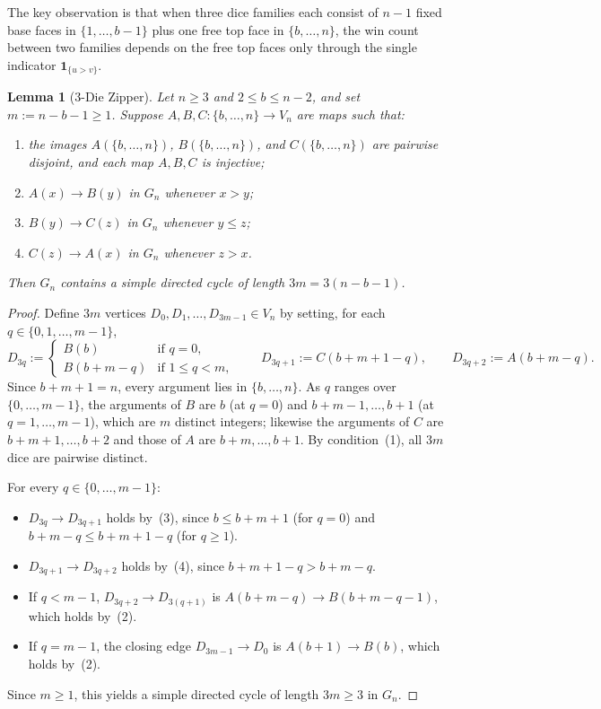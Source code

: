 \documentclass[11pt]{article}
\newtheorem{lemma}[theorem]{Lemma}
\begin{document}
The key observation is that when three dice families each consist of $n - 1$ fixed base faces in $\{1,\dots,b-1\}$ plus one free top face in $\{b,\dots,n\}$, the win count between two families depends on the free top faces only through the single indicator $\mathbf{1}_{\{u > v\}}$.

\begin{lemma}[3-Die Zipper]\label{lem:zipper}
Let $n \ge 3$ and $2 \le b \le n - 2$, and set $m := n - b - 1 \ge 1$. Suppose $A, B, C : \{b,\dots,n\} \to V_n$ are maps such that:
\begin{enumerate}
  \item the images $A(\{b,\dots,n\})$, $B(\{b,\dots,n\})$, and $C(\{b,\dots,n\})$ are pairwise disjoint, and each map $A, B, C$ is injective;
  \item $A(x) \to B(y)$ in $G_n$ whenever $x > y$;
  \item $B(y) \to C(z)$ in $G_n$ whenever $y \le z$;
  \item $C(z) \to A(x)$ in $G_n$ whenever $z > x$.
\end{enumerate}
Then $G_n$ contains a simple directed cycle of length $3m = 3(n - b - 1)$.
\end{lemma}

\begin{proof}
Define $3m$ vertices $D_0, D_1, \dots, D_{3m-1} \in V_n$ by setting, for each $q \in \{0, 1, \dots, m - 1\}$,
\[
  D_{3q} :=
  \begin{cases}
    B(b) & \text{if } q = 0, \\
    B(b + m - q) & \text{if } 1 \le q < m,
  \end{cases}
  \qquad
  D_{3q+1} := C(b + m + 1 - q),
  \qquad
  D_{3q+2} := A(b + m - q).
\]
Since $b + m + 1 = n$, every argument lies in $\{b,\dots,n\}$. As $q$ ranges over $\{0,\dots,m-1\}$, the arguments of $B$ are $b$ (at $q = 0$) and $b+m-1, \dots, b+1$ (at $q = 1,\dots,m-1$), which are $m$ distinct integers; likewise the arguments of $C$ are $b+m+1,\dots,b+2$ and those of $A$ are $b+m,\dots,b+1$. By condition~(1), all $3m$ dice are pairwise distinct.

For every $q \in \{0,\dots,m-1\}$:
\begin{itemize}
  \item $D_{3q} \to D_{3q+1}$ holds by~(3), since $b \le b+m+1$ (for $q = 0$) and $b+m-q \le b+m+1-q$ (for $q \ge 1$).
  \item $D_{3q+1} \to D_{3q+2}$ holds by~(4), since $b+m+1-q > b+m-q$.
  \item If $q < m - 1$, $D_{3q+2} \to D_{3(q+1)}$ is $A(b+m-q) \to B(b+m-q-1)$, which holds by~(2).
  \item If $q = m - 1$, the closing edge $D_{3m-1} \to D_0$ is $A(b+1) \to B(b)$, which holds by~(2).
\end{itemize}
Since $m \ge 1$, this yields a simple directed cycle of length $3m \ge 3$ in $G_n$.
\end{proof}
\end{document}
